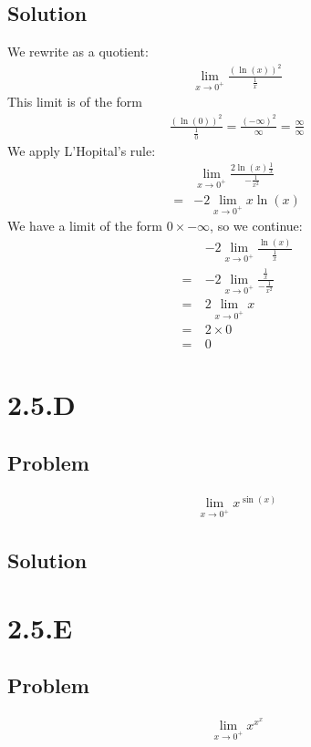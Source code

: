 \documentclass[12pt]{article}
\begin{document}
\subsection*{Solution}
We rewrite as a quotient:
\begin{align*}
    \lim_{x \to 0^+} \frac{(\ln(x))^2}{\frac{1}{x}}
\end{align*}
This limit is of the form
\begin{align*}
    \frac{(\ln(0))^2}{\frac{1}{0}} = \frac{(-\infty)^2}{\infty} = \frac{\infty}{\infty}
\end{align*}
We apply L'Hopital's rule:
\begin{align*}
     & \lim_{x \to 0^+} \frac{2 \ln(x) \frac{1}{x}}{-\frac{1}{x^2}} \\
    =& -2 \lim_{x \to 0^+} x \ln(x)
\end{align*}
We have a limit of the form $0 \times -\infty$, so we continue:
\begin{align*}
       & -2 \lim_{x \to 0^+} \frac{\ln(x)}{\frac{1}{x}} \\
    =\ & -2 \lim_{x \to 0^+} \frac{\frac{1}{x}}{-\frac{1}{x^2}} \\
    =\ & 2 \lim_{x \to 0^+} x \\
    =\ & 2 \times 0 \\
    =\ & 0
\end{align*}



\section*{2.5.D}

\subsection*{Problem}
\begin{align*}
    \lim_{x \to 0^+} x^{\sin(x)}
\end{align*}

\subsection*{Solution}




\section*{2.5.E}

\subsection*{Problem}
\begin{align*}
    \lim_{x \to 0^+} x^{x^x}
\end{align*}
\end{document}
